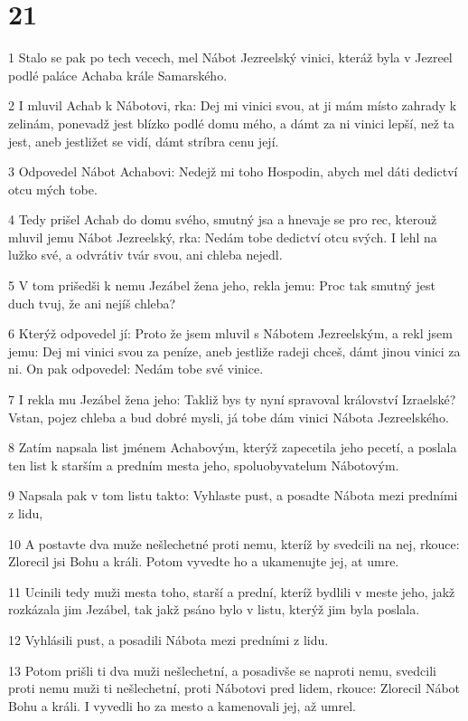 \chapter{21}

\par 1 Stalo se pak po tech vecech, mel Nábot Jezreelský vinici, kteráž byla v Jezreel podlé paláce Achaba krále Samarského.
\par 2 I mluvil Achab k Nábotovi, rka: Dej mi vinici svou, at ji mám místo zahrady k zelinám, ponevadž jest blízko podlé domu mého, a dámt za ni vinici lepší, než ta jest, aneb jestližet se vidí, dámt stríbra cenu její.
\par 3 Odpovedel Nábot Achabovi: Nedejž mi toho Hospodin, abych mel dáti dedictví otcu mých tobe.
\par 4 Tedy prišel Achab do domu svého, smutný jsa a hnevaje se pro rec, kterouž mluvil jemu Nábot Jezreelský, rka: Nedám tobe dedictví otcu svých. I lehl na lužko své, a odvrátiv tvár svou, ani chleba nejedl.
\par 5 V tom prišedši k nemu Jezábel žena jeho, rekla jemu: Proc tak smutný jest duch tvuj, že ani nejíš chleba?
\par 6 Kterýž odpovedel jí: Proto že jsem mluvil s Nábotem Jezreelským, a rekl jsem jemu: Dej mi vinici svou za peníze, aneb jestliže radeji chceš, dámt jinou vinici za ni. On pak odpovedel: Nedám tobe své vinice.
\par 7 I rekla mu Jezábel žena jeho: Takliž bys ty nyní spravoval království Izraelské? Vstan, pojez chleba a bud dobré mysli, já tobe dám vinici Nábota Jezreelského.
\par 8 Zatím napsala list jménem Achabovým, kterýž zapecetila jeho pecetí, a poslala ten list k starším a predním mesta jeho, spoluobyvatelum Nábotovým.
\par 9 Napsala pak v tom listu takto: Vyhlaste pust, a posadte Nábota mezi predními z lidu,
\par 10 A postavte dva muže nešlechetné proti nemu, kteríž by svedcili na nej, rkouce: Zlorecil jsi Bohu a králi. Potom vyvedte ho a ukamenujte jej, at umre.
\par 11 Ucinili tedy muži mesta toho, starší a prední, kteríž bydlili v meste jeho, jakž rozkázala jim Jezábel, tak jakž psáno bylo v listu, kterýž jim byla poslala.
\par 12 Vyhlásili pust, a posadili Nábota mezi predními z lidu.
\par 13 Potom prišli ti dva muži nešlechetní, a posadivše se naproti nemu, svedcili proti nemu muži ti nešlechetní, proti Nábotovi pred lidem, rkouce: Zlorecil Nábot Bohu a králi. I vyvedli ho za mesto a kamenovali jej, až umrel.
